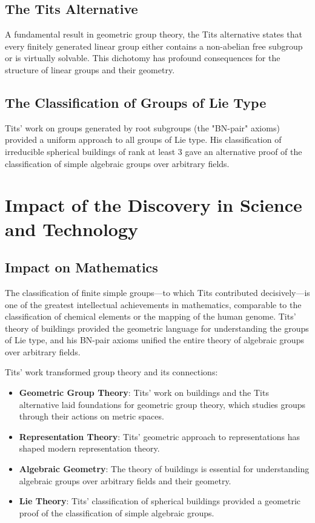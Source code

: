 \subsection{The Tits Alternative}

A fundamental result in geometric group theory, the Tits alternative states that every finitely generated linear group either contains a non-abelian free subgroup or is virtually solvable. This dichotomy has profound consequences for the structure of linear groups and their geometry.

\subsection{The Classification of Groups of Lie Type}

Tits' work on groups generated by root subgroups (the "BN-pair" axioms) provided a uniform approach to all groups of Lie type. His classification of irreducible spherical buildings of rank at least 3 gave an alternative proof of the classification of simple algebraic groups over arbitrary fields.

\section{Impact of the Discovery in Science and Technology}

\subsection{Impact on Mathematics}

\begin{whyitmatters}
The classification of finite simple groups---to which Tits contributed decisively---is one of the greatest intellectual achievements in mathematics, comparable to the classification of chemical elements or the mapping of the human genome. Tits' theory of buildings provided the geometric language for understanding the groups of Lie type, and his BN-pair axioms unified the entire theory of algebraic groups over arbitrary fields.
\end{whyitmatters}

Tits' work transformed group theory and its connections:

\begin{itemize}
\item \textbf{Geometric Group Theory}: Tits' work on buildings and the Tits alternative laid foundations for geometric group theory, which studies groups through their actions on metric spaces.

\item \textbf{Representation Theory}: Tits' geometric approach to representations has shaped modern representation theory.

\item \textbf{Algebraic Geometry}: The theory of buildings is essential for understanding algebraic groups over arbitrary fields and their geometry.

\item \textbf{Lie Theory}: Tits' classification of spherical buildings provided a geometric proof of the classification of simple algebraic groups.
\end{itemize}

